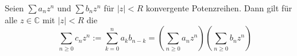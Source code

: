 Seien $\sum a_n z^n$ und $\sum b_n z^n$ für $|z| < R$ konvergente Potenzreihen. Dann gilt für alle $z \in \mathbb{C}$ mit $|z| < R$ die 
$$\sum_{n \geq 0} c_n z^n := \sum_{k=0}^n a_k b_{n-k} = \left(\sum_{n \geq 0} a_n z^n \right) \left( \sum_{n \geq 0} b_n z^n \right)$$